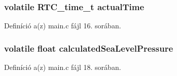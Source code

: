 \subsubsection[{actual\-Time}]{\setlength{\rightskip}{0pt plus 5cm}volatile R\-T\-C\-\_\-time\-\_\-t actual\-Time}\label{tasks_8c_adf161c6b74a74517e1683aa5f3cc038a}


Definíció a(z) main.\-c fájl 16. sorában.

\subsubsection[{calculated\-Sea\-Level\-Pressure}]{\setlength{\rightskip}{0pt plus 5cm}volatile float calculated\-Sea\-Level\-Pressure}\label{tasks_8c_ae33a247a27845609a2f5d2893060d2bb}


Definíció a(z) main.\-c fájl 18. sorában.

